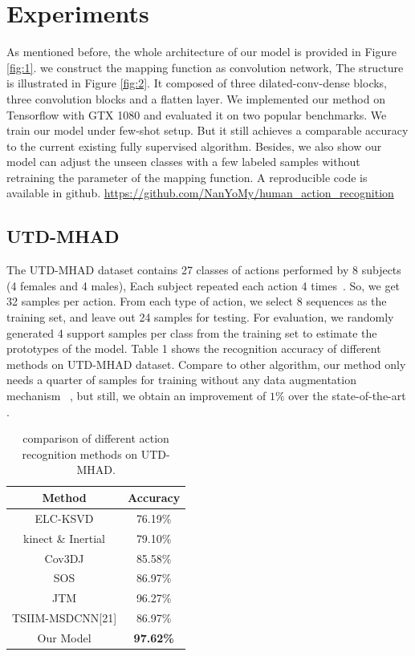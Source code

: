 \documentclass{bmvc2k}
\begin{document}
\section{Experiments}
As mentioned before, the whole architecture of our model is provided in Figure \ref{fig:1}. we construct the mapping function as convolution network, The structure is illustrated in Figure \ref{fig:2}. It composed of three dilated-conv-dense blocks, three convolution blocks and a flatten layer. We implemented our method on Tensorflow with GTX 1080 and evaluated it on two popular benchmarks. We train our model under few-shot setup. But it still achieves a comparable accuracy to the current existing fully supervised algorithm. Besides, we also show our model can adjust the unseen classes with a few labeled samples without retraining the parameter of the mapping function. A reproducible code is available in github. \url{https://github.com/NanYoMy/human_action_recognition}

\subsection*{UTD-MHAD}
The UTD-MHAD dataset contains 27 classes of actions performed by 8 subjects (4 females and 4 males), Each subject repeated each action 4 times~\cite{chen2015utd}. So, we get 32 samples per action. From each type of action, we select 8 sequences as the training set, and leave out 24 samples for testing. For evaluation, we randomly generated 4 support samples per class from the training set to estimate the prototypes of the model. Table 1 shows the recognition accuracy of different methods on UTD-MHAD dataset. Compare to other algorithm, our method only needs a quarter of samples for training without any data augmentation mechanism ~\cite{pham2017learning,pham2017learning}, but still, we obtain an improvement of $1\%$ over the state-of-the-art .

\begin{table}[htb]
	\begin{center}		
		\begin{tabular}{|c|c|}
			\hline
			Method & Accuracy \\
			\hline\hline
			ELC-KSVD & 76.19\% \\
			kinect \& Inertial & 79.10\% \\
			Cov3DJ & 85.58\%\\
			SOS & 86.97\% \\
			JTM & 96.27\% \\
			TSIIM-MSDCNN[21] & 86.97\% \\
			Our Model & \bf{97.62\%} \\
			\hline
		\end{tabular}	
	\end{center}		
	\caption{ comparison of different action recognition methods on UTD-MHAD.}
	\label{tab:1}
\end{table}
\end{document}
